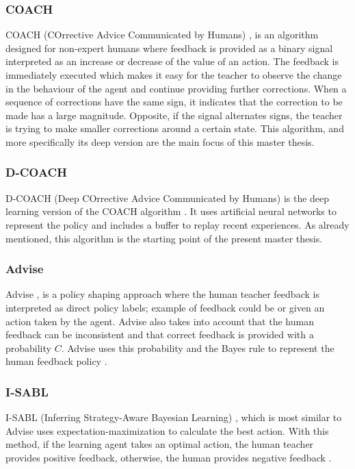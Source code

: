  
 \subsubsection*{COACH}
COACH (COrrective Advice Communicated by Humans) \cite{COACH-Celemin-Ruiz-del-Solar:2015}, is an algorithm designed for non-expert humans where feedback is provided as a binary signal interpreted as an increase or decrease of the value of an action.  The feedback is immediately executed which makes it easy for the teacher to observe the change in the behaviour of the agent and continue providing further corrections. When a sequence of corrections have the same sign, it indicates that the correction to be made has a large magnitude. Opposite, if the signal alternates signs, the teacher is trying to make smaller corrections around a certain state.
This algorithm, and more specifically its deep version \cite{D-COACH-Dattari-Celemin-Ruiz-del-Solar-Kober:2018} are the main focus of this master thesis.


\subsubsection*{D-COACH}
D-COACH (Deep COrrective Advice Communicated by Humans) \cite{D-COACH-Dattari-Celemin-Ruiz-del-Solar-Kober:2018} is the deep learning version of the COACH algorithm \cite{COACH-Celemin-Ruiz-del-Solar:2015}. It uses artificial neural networks to represent the policy and includes a buffer to replay recent experiences. As already mentioned, this algorithm is the starting point of the present master thesis.



\subsubsection*{Advise}
Advise \cite{Advise-Griffith-et-al:2013}, is a policy shaping approach where the human teacher feedback is interpreted as direct policy labels; example of feedback could be  or  given an action taken by the agent. Advise also takes into account that the human feedback can be inconsistent and that correct feedback is provided with a probability $C$. Advise uses this probability and the Bayes rule to represent the human feedback policy \cite{leveraging-human-guidance:2019}.

\subsubsection*{I-SABL}
I-SABL (Inferring Strategy-Aware Bayesian Learning) \cite{I-SABL-Loftin:2016}, which is most similar to Advise \cite{Advise-Griffith-et-al:2013} uses expectation-maximization to calculate the best action. With this method, if the learning agent takes an optimal action, the human teacher provides positive feedback, otherwise, the human provides negative feedback \cite{leveraging-human-guidance:2019}.


